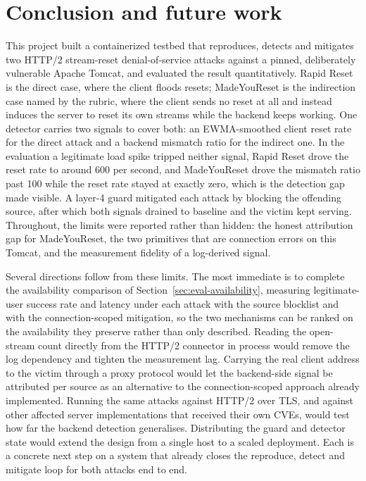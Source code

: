 \documentclass[a4paper,fleqn]{cas-dc}
\begin{document}
\section{Conclusion and future work}\label{sec:conclusion}

This project built a containerized testbed that reproduces, detects and mitigates two HTTP/2 stream-reset denial-of-service attacks against a pinned, deliberately vulnerable Apache Tomcat, and evaluated the result quantitatively. Rapid Reset is the direct case, where the client floods resets; MadeYouReset is the indirection case named by the rubric, where the client sends no reset at all and instead induces the server to reset its own streams while the backend keeps working. One detector carries two signals to cover both: an EWMA-smoothed client reset rate for the direct attack and a backend mismatch ratio for the indirect one. In the evaluation a legitimate load spike tripped neither signal, Rapid Reset drove the reset rate to around 600 per second, and MadeYouReset drove the mismatch ratio past 100 while the reset rate stayed at exactly zero, which is the detection gap made visible. A layer-4 guard mitigated each attack by blocking the offending source, after which both signals drained to baseline and the victim kept serving. Throughout, the limits were reported rather than hidden: the honest attribution gap for MadeYouReset, the two primitives that are connection errors on this Tomcat, and the measurement fidelity of a log-derived signal.

Several directions follow from these limits. The most immediate is to complete the availability comparison of Section~\ref{sec:eval-availability}, measuring legitimate-user success rate and latency under each attack with the source blocklist and with the connection-scoped mitigation, so the two mechanisms can be ranked on the availability they preserve rather than only described. Reading the open-stream count directly from the HTTP/2 connector in process would remove the log dependency and tighten the measurement lag. Carrying the real client address to the victim through a proxy protocol would let the backend-side signal be attributed per source as an alternative to the connection-scoped approach already implemented. Running the same attacks against HTTP/2 over TLS, and against other affected server implementations that received their own CVEs, would test how far the backend detection generalises. Distributing the guard and detector state would extend the design from a single host to a scaled deployment. Each is a concrete next step on a system that already closes the reproduce, detect and mitigate loop for both attacks end to end.

\clearpage


\end{document}
